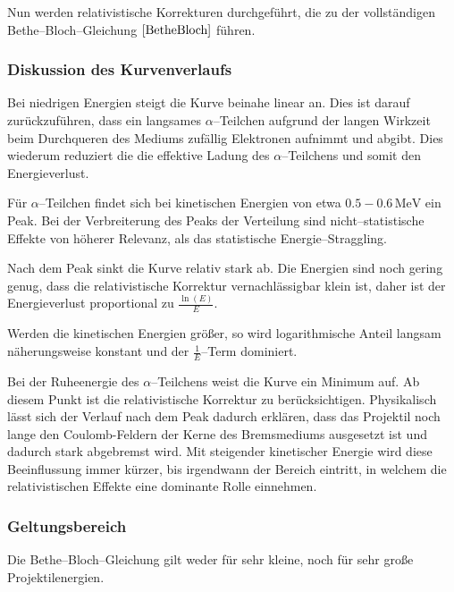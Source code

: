 \documentclass[12pt,a4paper]{scrartcl}
\numberwithin{equation}{section} %
\begin{document}
\noindent
Nun werden relativistische Korrekturen durchgeführt, die zu der vollständigen Bethe--Bloch--Gleichung $\eqref{BetheBloch}$ führen.

\hypertarget{diskussion-des-kurvenverlaufs}{%
\subsubsection{Diskussion des
Kurvenverlaufs}\label{diskussion-des-kurvenverlaufs}}

Bei niedrigen Energien steigt die Kurve beinahe linear an. Dies ist darauf zurückzuführen, dass ein langsames $\alpha$--Teilchen aufgrund der langen Wirkzeit beim Durchqueren des Mediums zufällig Elektronen aufnimmt und abgibt. Dies wiederum reduziert die die effektive Ladung des $\alpha$--Teilchens und somit den Energieverlust.

Für $\alpha$--Teilchen findet sich bei kinetischen Energien von etwa $0.5-0.6\mathrm{\,MeV}$ ein Peak. Bei der Verbreiterung des Peaks der Verteilung sind nicht--statistische Effekte von höherer Relevanz, als das statistische Energie--Straggling.

Nach dem Peak sinkt die Kurve relativ stark ab. Die Energien sind noch gering genug, dass die relativistische Korrektur vernachlässigbar klein ist, daher ist der Energieverlust proportional zu $\frac{\ln(E)}{E}$.

Werden die kinetischen Energien größer, so wird logarithmische Anteil langsam näherungsweise konstant und der $\frac{1}{E}$--Term dominiert.

Bei der Ruheenergie des $\alpha$--Teilchens weist die Kurve ein Minimum auf. Ab diesem Punkt ist die relativistische Korrektur zu berücksichtigen. Physikalisch lässt sich der Verlauf nach dem Peak dadurch erklären, dass das Projektil noch lange den Coulomb-Feldern der Kerne des Bremsmediums ausgesetzt ist und dadurch stark abgebremst wird. Mit steigender kinetischer Energie wird diese Beeinflussung immer kürzer, bis irgendwann der Bereich eintritt, in welchem die relativistischen Effekte eine dominante Rolle einnehmen.

\hypertarget{geltungsbereich}{%
\subsubsection{Geltungsbereich}\label{geltungsbereich}}

Die Bethe--Bloch--Gleichung gilt weder für sehr kleine, noch für sehr große Projektilenergien.
\end{document}
